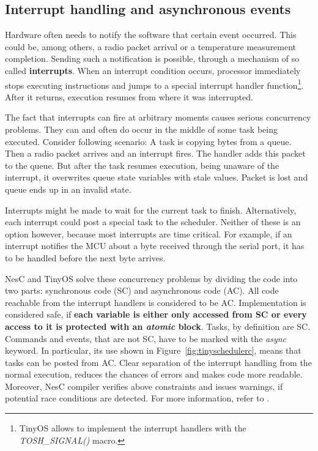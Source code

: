 \subsection{Interrupt handling and asynchronous events}
\label{sec:interrupts_and_async}

Hardware often needs to notify the software that certain event
occurred. This could be, among others, a radio packet arrival or a temperature
measurement completion. Sending such a notification is possible,
through a mechanism of so called {\bf interrupts}. When an interrupt
condition occurs, processor immediately stops executing instructions
and jumps to a special interrupt handler function\footnote{TinyOS
allows to implement the interrupt handlers with the
\emph{TOSH\_SIGNAL()} macro.}. After it returns, execution resumes
from where it was interrupted.

The fact that interrupts can fire at arbitrary moments causes serious
concurrency problems. They can and often do occur in the middle of
some task being executed.  Consider following scenario: A task is
copying bytes from a queue. Then a radio packet arrives and an interrupt
fires. The handler adds this packet to the queue. But after the task
resumes execution, being unaware of the interrupt, it overwrites queue
state variables with stale values.  Packet is lost and queue ends up
in an invalid state.

Interrupts might be made to wait for the current task to finish.
Alternatively, each interrupt could post a special task to the
scheduler. Neither of these is an option however, because most
interrupts are time critical. For example, if an interrupt notifies
the MCU about a byte received through the serial port, it has to be
handled before the next byte arrives.

NesC and TinyOS solve these concurrency problems by dividing the code
into two parts: synchronous code (SC) and asynchronous code (AC).  All
code reachable from the interrupt handlers is considered to be AC.
Implementation is considered safe, if {\bf each variable is either only
accessed from SC or every access to it is protected with an
\emph{atomic} block}. Tasks, by definition are SC. Commands and
events, that are not SC, have to be marked with the \emph{async}
keyword. In particular, its use shown in
Figure~\ref{fig:tinyschedulerc}, means that tasks can be posted from
AC. Clear separation of the interrupt handling from the normal execution,
reduces the chances of errors and makes code more readable. Moreover, NesC
compiler verifies above constraints and issues warnings, if potential
race conditions are detected. For more information, refer to
\cite[ch. 8]{NesCMan}.

